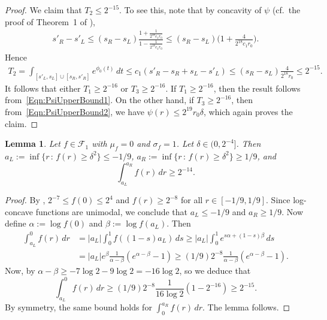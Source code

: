 \documentclass[a4paper,12pt]{article}
\newtheorem{lemma}[theorem]{Lemma}
\begin{document}
\begin{proof}
We claim that $T_2 \leq 2^{-15}$.  To see this, note that by concavity of $\psi$ (cf.~the proof of Theorem~1 of \citet{CSS2010}),
  \begin{align*}
    s'_R - s'_L \leq (s_R - s_L) \frac{ 1 + \frac{1}{2^{18}c_1r_0}}
      {1 - \frac{1}{2^{18}c_1r_0}} \leq (s_R - s_L) \biggl( 1 + \frac{4}{2^{18}c_1r_0} \biggr).
  \end{align*}
Hence
  \begin{align*}
    T_2 = \int_{[s'_L, s_L] \cup [s_R, s'_R]} e^{\phi_0(t)} \, dt \leq c_1( s'_R - s_R + s_L - s'_L) \leq (s_R - s_L) \frac{4}{2^{18} r_0 } \leq 2^{-15}.
  \end{align*}
It follows that either $T_1 \geq 2^{-16}$ or $T_3 \geq 2^{-16}$. If $T_1 \geq 2^{-16}$, then the result follows from~\eqref{Eqn:PsiUpperBound1}.  On the other hand, if $T_3 \geq 2^{-16}$, then from~\eqref{Eqn:PsiUpperBound2}, we have $\psi(r) \leq 2^{19} r_0 \delta$, which again proves the claim.
\end{proof}

\begin{lemma}
  \label{Lem:LogConcaveCentralMass}
  Let $f \in \mathcal{F}_1$ with $\mu_f = 0$ and $\sigma_f=1$. Let $\delta \in (0,2^{-4}]$. Then $a_L := \inf \{ r \,:\, f(r) \geq \delta^2\} \leq -1/9$, $a_R := \inf \{ r \,:\, f(r) \geq \delta^2\} \geq 1/9$, and
  \begin{equation}
\label{Eq:Int}
    \int_{a_L}^{a_R} f(r) \, dr \geq 2^{-14}.
  \end{equation}
\end{lemma}
\begin{proof}
By \citet[][Theorem~5.14(d)]{lovasz2007geometry}, $2^{-7} \leq f(0) \leq 2^4$ and $f(r) \geq 2^{-8}$ for all $r \in [-1/9, 1/9]$. Since log-concave functions are unimodal, we conclude that $a_L \leq -1/9$ and $a_R \geq 1/9$.  Now define $\alpha := \log f(0)$ and $\beta := \log f(a_L)$.  Then 
  \begin{align*}
    \int_{a_L}^0 f(r) \, dr
    & = |a_L| \int_0^1 f( (1 - s) a_L ) \, d s \geq |a_L| \int_0^1 e^{s\alpha + (1-s) \beta} \, d s \\
    &= |a_L| e^{\beta} \frac{1}{\alpha - \beta} (e^{\alpha - \beta}-1) \geq (1/9) 2^{-8} \frac{1}{\alpha - \beta} (e^{\alpha - \beta}-1).
  \end{align*}
Now, by \citet[][Theorems~5.14(b) and~5.14(d)]{lovasz2007geometry} $\alpha - \beta \geq -7 \log 2 - 9 \log 2 = -16\log 2$, so we deduce that 
\[
\int_{a_L}^0 f(r) \, dr \geq (1/9) 2^{-8} \frac{1}{16 \log 2}(1-2^{-16}) \geq 2^{-15}.
\]
By symmetry, the same bound holds for $\int_0^{a_R} f(r) \, dr$. The lemma follows.
\end{proof}
\end{document}
